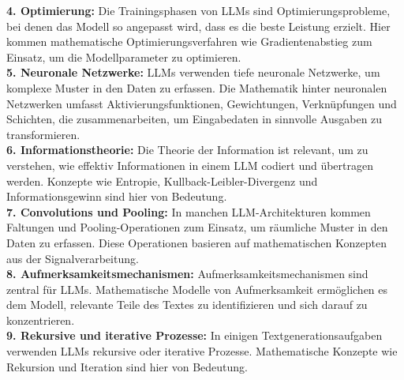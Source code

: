 \documentclass[12pt]{article}
\begin{document}
\textbf{4. Optimierung:} Die Trainingsphasen von LLMs sind Optimierungsprobleme, bei denen das Modell so angepasst wird, dass es die beste Leistung erzielt. Hier kommen mathematische Optimierungsverfahren wie Gradientenabstieg zum Einsatz, um die Modellparameter zu optimieren.\\

\textbf{5. Neuronale Netzwerke:} LLMs verwenden tiefe neuronale Netzwerke, um komplexe Muster in den Daten zu erfassen. Die Mathematik hinter neuronalen Netzwerken umfasst Aktivierungsfunktionen, Gewichtungen, Verknüpfungen und Schichten, die zusammenarbeiten, um Eingabedaten in sinnvolle Ausgaben zu transformieren.\\

\textbf{6. Informationstheorie:} Die Theorie der Information ist relevant, um zu verstehen, wie effektiv Informationen in einem LLM codiert und übertragen werden. Konzepte wie Entropie, Kullback-Leibler-Divergenz und Informationsgewinn sind hier von Bedeutung.\\

\textbf{7. Convolutions und Pooling:} In manchen LLM-Architekturen kommen Faltungen und Pooling-Operationen zum Einsatz, um räumliche Muster in den Daten zu erfassen. Diese Operationen basieren auf mathematischen Konzepten aus der Signalverarbeitung.\\

\textbf{8. Aufmerksamkeitsmechanismen:} Aufmerksamkeitsmechanismen sind zentral für LLMs. Mathematische Modelle von Aufmerksamkeit ermöglichen es dem Modell, relevante Teile des Textes zu identifizieren und sich darauf zu konzentrieren.\\

\textbf{9. Rekursive und iterative Prozesse:} In einigen Textgenerationsaufgaben verwenden LLMs rekursive oder iterative Prozesse. Mathematische Konzepte wie Rekursion und Iteration sind hier von Bedeutung.\\
\end{document}

